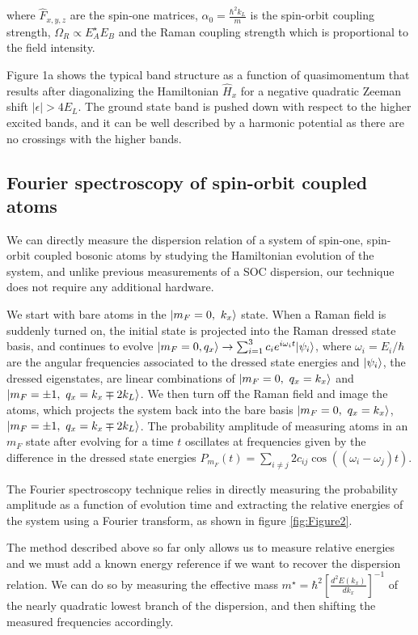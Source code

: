  where $\hat{F}_{x,y,z}$ are the spin-one matrices,  $\alpha_0=\frac{\hbar^2k_L}{m}$ is the spin-orbit coupling strength, $\Omega_R\propto E_A^{\star}E_B$ and the Raman coupling strength which is proportional to the field intensity. 
 
Figure 1a shows the typical band structure as a function of quasimomentum that results after diagonalizing the Hamiltonian $\hat{H}_x$ for a negative quadratic Zeeman shift $|\epsilon|>4E_L$. The ground state band is pushed down with respect to the higher excited bands, and it can be well described by a harmonic potential as there are no crossings with the higher bands. 

\subsection{Fourier spectroscopy of spin-orbit coupled atoms}		

 We can directly measure the dispersion relation of a system of spin-one, spin-orbit coupled bosonic atoms by studying the Hamiltonian evolution of the system, and unlike previous measurements of a SOC dispersion, our technique does not require any additional hardware. 

We start with bare atoms in the $|m_F=0,\ k_x\rangle$ state. When a Raman field is suddenly turned on, the initial state is projected into the Raman dressed state basis, and continues to evolve 
$|m_F=0, q_x\rangle\rightarrow \sum_{i=1}^3c_{i}e^{i\omega_it} |\psi_i\rangle$, where $\omega_i=E_i/\hbar$ are the angular frequencies associated to the dressed state energies and $|\psi_i\rangle$, the dressed eigenstates,  are linear combinations of $\ket{m_F=0,\ q_x=k_x}$ and $\ket{m_F=\pm1,\ q_x=k_x\mp2k_L}$. We then turn off the Raman field and image the atoms, which projects the system back into the bare basis $\ket{m_F=0,\ q_x=k_x}$, $\ket{m_F=\pm1,\ q_x=k_x\mp2k_L}$. The probability amplitude of measuring atoms in an $m_F$ state after evolving for a time $t$ oscillates at frequencies given by the difference in the dressed state energies $P_{m_F}(t)=\sum\limits_{i\neq j} 2c_{ij}\cos((\omega_i-\omega_j)t)$.

The Fourier spectroscopy technique relies in directly measuring the probability amplitude as a function of evolution time and extracting the relative energies of the system using a Fourier transform, as shown in figure \ref{fig:Figure2}.

 


The method described above so far only allows us to measure relative energies and we must add a known energy reference if we want to recover the dispersion relation. We can do so by measuring the effective mass $m^{\star} = \hbar^2[\frac{d^2E(k_x)}{dk_x}]^{-1}$ of the nearly quadratic lowest branch of the dispersion, and then shifting the measured frequencies accordingly. 

